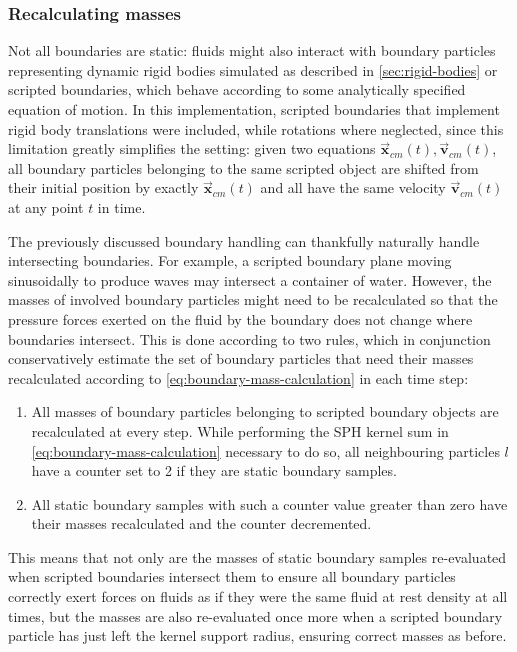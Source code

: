 \documentclass[oneside, a4paper]{book}
\newcommand\vek[1]{\vec{\bm{#1}}}
\begin{document}
    \subsubsection{Recalculating masses}
    Not all boundaries are static: fluids might also interact with boundary particles representing dynamic rigid bodies simulated as described in \autoref{sec:rigid-bodies} or scripted boundaries, which behave according to some analytically specified equation of motion. In this implementation, scripted boundaries that implement rigid body translations were included, while rotations where neglected, since this limitation greatly simplifies the setting: given two equations $\vek{x}_{cm}(t), \vek{v}_{cm}(t)$, all boundary particles belonging to the same scripted object are shifted from their initial position by exactly $\vek{x}_{cm}(t)$ and all have the same velocity $\vek{v}_{cm}(t)$ at any point $t$ in time. 

    The previously discussed boundary handling can thankfully naturally handle intersecting boundaries. For example, a scripted boundary plane moving sinusoidally to produce waves may intersect a container of water. However, the masses of involved boundary particles might need to be recalculated so that the pressure forces exerted on the fluid by the boundary does not change where boundaries intersect. This is done according to two rules, which in conjunction conservatively estimate the set of boundary particles that need their masses recalculated according to \autoref{eq:boundary-mass-calculation} in each time step:
    \begin{enumerate}
      \item All masses of boundary particles belonging to scripted boundary objects are recalculated at every step. While performing the SPH kernel sum in \autoref{eq:boundary-mass-calculation} necessary to do so, all neighbouring particles $l$ have a counter set to 2 if they are static boundary samples.
      \item All static boundary samples with such a counter value greater than zero have their masses recalculated and the counter decremented.
    \end{enumerate}
    This means that not only are the masses of static boundary samples re-evaluated when scripted boundaries intersect them to ensure all boundary particles correctly exert forces on fluids as if they were the same fluid at rest density at all times, but the masses are also re-evaluated once more when a scripted boundary particle has just left the kernel support radius, ensuring correct masses as before. 
    
\end{document}

